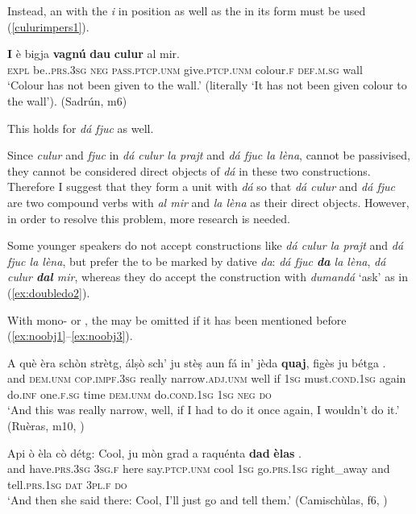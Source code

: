 Instead, an  with the  \textit{i} in  position  as well as the  in its  form must be used (\ref{culurimpers1}).

\ea
\label{culurimpers1}
\gll  \textbf{I} è   bigja \textbf{vagnú} \textbf{dau} \textbf{culur} al mir.\\
\textsc{expl} be.\textsc{.prs.3sg} \textsc{neg} \textsc{pass.ptcp.unm} give.\textsc{ptcp.unm}  colour.\textsc{f} \textsc{def.m.sg} wall\\
\glt `Colour has not been given to the wall.' (literally `It has not been given colour to the wall'). (Sadrún, m6)
\z


This holds for \textit{dá fjuc} as well.

Since \textit{culur} and \textit{fjuc} in \textit{dá culur la prajt} and \textit{dá fjuc la lèna}, cannot be passivised, they cannot be considered direct objects of \textit{dá} in these two constructions. Therefore I suggest that they form a unit with \textit{dá} so that \textit{dá culur} and \textit{dá fjuc} are two compound  verbs with \textit{al mir} and \textit{la lèna} as their direct objects. However, in order to resolve this problem, more research is needed.

Some younger speakers do not accept  constructions like \textit{dá culur la prajt} and \textit{dá fjuc la lèna}, but prefer the  to be marked by dative \textit{da}:\textit{ dá fjuc \textbf{da} la lèna}, \textit{dá culur \textbf{dal} mir}, whereas they do accept the construction with \textit{dumandá} `ask' as in (\ref{ex:doubledo2}).


With mono- or , the  may be omitted if it has been mentioned before (\ref{ex:noobj1}--\ref{ex:noobj3}).

\ea
\label{ex:noobj1}
\gll  A què èra schòn strètg, álṣò sch’ ju stèṣ aun fá in’ jèda \textbf{quaj}, figès ju bétga {\ob}\longrule{\cb}.  \\
and \textsc{dem.unm} \textsc{cop.impf.3sg} really narrow.\textsc{adj.unm} well if \textsc{1sg}  must.\textsc{cond.1sg} again do.\textsc{inf} one.\textsc{f.sg} time \textsc{dem.unm} do.\textsc{cond.1sg} \textsc{1sg} \textsc{neg} \textsc{do} \\
\glt `And this was really narrow, well, if I had to do it once again, I wouldn’t do it.' (Ruèras, m10, )
\z

\ea
\label{ex:noobj2}
\gll    Api ò èla cò détg: Cool, ju mòn grad a raquénta {\ob}\textbf{dad} \textbf{èlas}{\cb} {\ob}\textbf{{\longrule}}{\cb}.\\
and have.\textsc{prs.3sg} \textsc{3sg.f} here say.\textsc{ptcp.unm} cool \textsc{1sg}  go.\textsc{prs.1sg} right\_away and tell.\textsc{prs.1sg} \textsc{dat} \textsc{3pl.f} \textsc{do}\\
\glt `And then she said there: Cool, I’ll just go and tell them.' (Camischùlas, f6, )
\z

